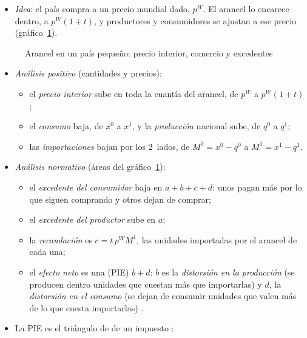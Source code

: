 \documentclass[11pt]{article}
\begin{document}
\begin{itemize}
\item \emph{Idea}: el país compra a un precio mundial dado, $p^W$. El arancel lo encarece dentro, a $p^W(1+t)$, y productores y consumidores se ajustan a ese precio (gráfico~\ref{fig:arancel-pequeno}).
\end{itemize}
\begin{figure}[H]
\centering
\caption{Arancel en un país pequeño: precio interior, comercio y excedentes}\label{fig:arancel-pequeno}
\end{figure}
\begin{itemize}
\item \emph{Análisis positivo} (cantidades y precios):
  \begin{itemize}
  \item el \emph{precio interior} sube en toda la cuantía del arancel, de $p^W$ a $p^W(1+t)$;
  \item el \emph{consumo} baja, de $x^0$ a $x^1$, y la \emph{producción} nacional sube, de $q^0$ a $q^1$;
  \item las \emph{importaciones} bajan por los 2~lados, de $M^0=x^0-q^0$ a $M^1=x^1-q^1$.
  \end{itemize}
\item \emph{Análisis normativo} (áreas del gráfico~\ref{fig:arancel-pequeno}):
  \begin{itemize}
  \item el \emph{excedente del consumidor} baja en $a+b+c+d$: unos pagan más por lo que siguen comprando y otros dejan de comprar;
  \item el \emph{excedente del productor} sube en $a$;
  \item la \emph{recaudación} es $c=t\,p^WM^1$, las unidades importadas por el arancel de cada una;
  \item el \emph{efecto neto} es una  (PIE) $b+d$: $b$ es la \emph{distorsión en la producción} (se producen dentro unidades que cuestan más que importarlas) y $d$, la \emph{distorsión en el consumo} (se dejan de consumir unidades que valen más de lo que cuesta importarlas) .
  \end{itemize}
\item La PIE es el triángulo de  de un impuesto :
  \begin{equation}\label{eq:pie-arancel}

\end{equation}
\end{itemize}
\end{document}
